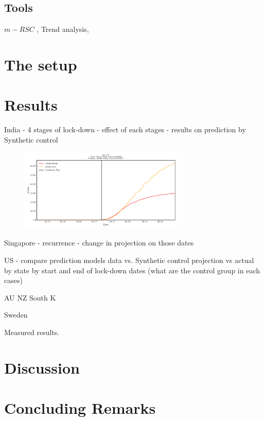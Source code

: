 \documentclass[preprint,authoryear,12pt]{elsarticle}
\begin{document}
	\subsection{Tools}
	
	$m-RSC$ \cite{ap08746, JMLR18}, Trend analysis, 
	
	
	
	\section{The setup}
    \label{SEC2}
	
	
	\section{Results}
	\label{SEC3}
	
	India - 4 stages of lock-down - effect of each stages - results on prediction by Synthetic control
\begin{figure}[ht]
	\includegraphics[width=0.7\textwidth]{New York}
\end{figure}

	Singapore - recurrence - change in projection on those dates
	
	US - compare prediction models data vs. Synthetic control projection vs actual by state by start and end of lock-down dates (what are the control group in each cases)
	
	AU NZ South K
	
	Sweden
	
	Measured results. 
	
	\section{Discussion}
	\label{SEC4}
	
	
	\section{Concluding Remarks}
	\label{SEC5}
	
	
		
\end{document}
